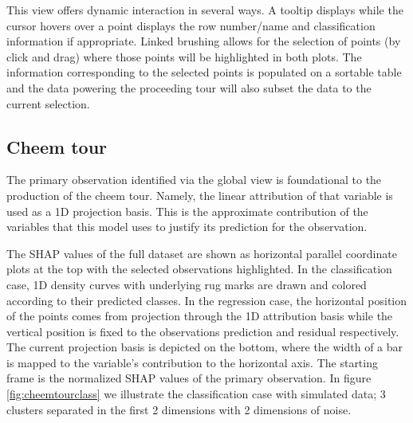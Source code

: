 \documentclass[
]{article}
\begin{document}
This view offers dynamic interaction in several ways. A tooltip displays while the cursor hovers over a point displays the row number/name and classification information if appropriate. Linked brushing allows for the selection of points (by click and drag) where those points will be highlighted in both plots. The information corresponding to the selected points is populated on a sortable table and the data powering the proceeding tour will also subset the data to the current selection.

\hypertarget{cheem-tour}{%
\subsection{Cheem tour}\label{cheem-tour}}

The primary observation identified via the global view is foundational to the production of the cheem tour. Namely, the linear attribution of that variable is used as a 1D projection basis. This is the approximate contribution of the variables that this model uses to justify its prediction for the observation.

The SHAP values of the full dataset are shown as horizontal parallel coordinate plots at the top with the selected observations highlighted. In the classification case, 1D density curves with underlying rug marks are drawn and colored according to their predicted classes. In the regression case, the horizontal position of the points comes from projection through the 1D attribution basis while the vertical position is fixed to the observations prediction and residual respectively. The current projection basis is depicted on the bottom, where the width of a bar is mapped to the variable's contribution to the horizontal axis. The starting frame is the normalized SHAP values of the primary observation. In figure \ref{fig:cheemtourclass} we illustrate the classification case with simulated data; 3 clusters separated in the first 2 dimensions with 2 dimensions of noise.
\end{document}
